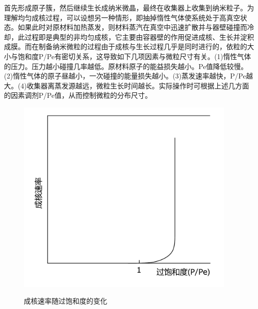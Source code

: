 \documentclass[a4paper]{article}
\begin{document}
首先形成原子簇，然后继续生长成纳米微晶，最终在收集器上收集到纳米粒子。为理解均匀成核过程，可以设想另一种情形，即抽掉惰性气体使系统处于高真空状态。如果此时对原材料加热蒸发，则材料蒸汽在真空中迅速扩散并与器壁碰撞而冷却，此过程即是典型的非均匀成核，它主要由容器壁的作用促进成核、生长并淀积成膜。而在制备纳米微粒的过程由于成核与生长过程几乎是同时进行的，依粒的大小与饱和度P/Pe有密切关系，这导致如下几项因素与微粒尺寸有关。(1)惰性气体的压力。压力越小碰撞几率越低。原材料原子的能益损失越小。Pe值降低较慢。(2)惰性气体的原子昼越小，一次碰撞的能量损失越小。(3)蒸发速率越快，P/Pe越大。(4)收集器离蒸发源越远，微粒生长时间越长。实际操作时可根据上述几方面的因素调剂P/Pe值，从而控制微粒的分布尺寸。
\begin{figure}[!h]
\begin{minipage}{0.48\textwidth}
\begin{center}
\includegraphics[width=0.95\textwidth]{fig/fig5.pdf}\\
\caption{成核速率随过饱和度的变化}\label{fig5}
\end{center}
\end{minipage}
\begin{minipage}{0.48\textwidth}
\begin{center}

\end{center}
\end{minipage}
\end{figure}
\end{document}
